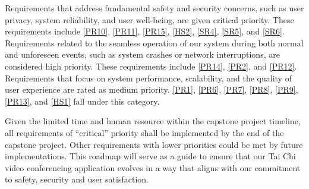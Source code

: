 \documentclass{article}
\begin{document}
Requirements that address fundamental safety and security concerns, such as user
privacy, system reliability, and user well-being, are given critical priority.
These requirements include \ref{PR10}, \ref{PR11}, \ref{PR15}, \ref{HS2},
\ref{SR4}, \ref{SR5}, and \ref{SR6}. Requirements related to the seamless
operation of our system during both normal and unforeseen events, such as system
crashes or network interruptions, are considered high priority. These
requirements include \ref{PR14}, \ref{PR2}, and \ref{PR12}. Requirements that
focus on system performance, scalability, and the quality of user experience are
rated as medium priority. \ref{PR1}, \ref{PR6}, \ref{PR7}, \ref{PR8}, \ref{PR9},
\ref{PR13}, and \ref{HS1} fall under this category.

Given the limited time and human resource within the capstone project timeline,
all requirements of ``critical'' priority shall be implemented by the end of the
capstone project. Other requirements with lower priorities could be met by
future implementations. This roadmap will serve as a guide to ensure that our
Tai Chi video conferencing application evolves in a way that aligns with our
commitment to safety, security and user satisfaction.

\printbibliography[heading=bibnumbered]{}
\end{document}
